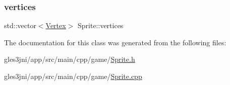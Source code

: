 \subsubsection{\texorpdfstring{vertices}{vertices}}
{\footnotesize\ttfamily std\+::vector$<$\hyperlink{struct_vertex}{Vertex}$>$ Sprite\+::vertices\hspace{0.3cm}{\ttfamily [private]}}



The documentation for this class was generated from the following files\+:\begin{DoxyCompactItemize}
\item 
gles3jni/app/src/main/cpp/game/\hyperlink{_sprite_8h}{Sprite.\+h}\item 
gles3jni/app/src/main/cpp/game/\hyperlink{_sprite_8cpp}{Sprite.\+cpp}\end{DoxyCompactItemize}
